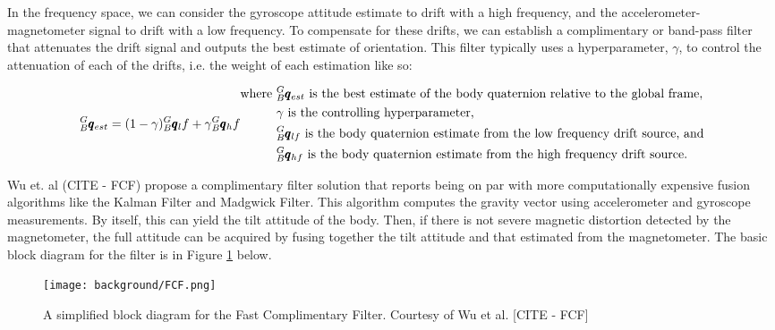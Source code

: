 In the frequency space, we can consider the gyroscope attitude estimate to drift with a high frequency, and the accelerometer-magnetometer signal to drift with a low frequency.
To compensate for these drifts, we can establish a complimentary or band-pass filter that attenuates the drift signal and outputs the best estimate of orientation.
This filter typically uses a hyperparameter, $\gamma$, to control the attenuation of each of the drifts, i.e. the weight of each estimation like so:

\begin{gather}
    {}^G_B\pmb{q}_{est} = (1-\gamma){}^G_B\pmb{q}_lf + \gamma {}^G_B\pmb{q}_hf
    \begin{aligned}
        \text{where } &{}^G_B\pmb{q}_{est} \text{ is the best estimate of the body quaternion relative to the global frame,} \\
                      &\gamma \text{ is the controlling hyperparameter, } \\
                      &{}^G_B\pmb{q}_{lf} \text{ is the body quaternion estimate from the low frequency drift source, and} \\
                      &{}^G_B\pmb{q}_{hf} \text{ is the body quaternion estimate from the high frequency drift source.}
    \end{aligned} \notag
\end{gather}

Wu et. al (CITE - FCF) propose a complimentary filter solution that reports being on par with more computationally expensive fusion algorithms like the Kalman Filter and Madgwick Filter.
This algorithm computes the gravity vector using accelerometer and gyroscope measurements.
By itself, this can yield the tilt attitude of the body.
Then, if there is not severe magnetic distortion detected by the magnetometer, the full attitude can be acquired by fusing together the tilt attitude and that estimated from the magnetometer.
The basic block diagram for the filter is in Figure \ref{fig:fcf_diagram} below.

\begin{figure}
    \centering
    \label{fig:fcf_diagram}
    \texttt{[image: background/FCF.png]}
    \caption[Kalman Filter Process]{A simplified block diagram for the Fast Complimentary Filter. 
    Courtesy of Wu et al. [CITE - FCF]}
\end{figure}

